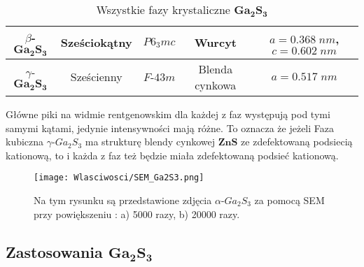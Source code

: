 \begin{table}[H]
\begin{tabular}{|c|c|c|c|c|}
		$\beta$-$\mathbf{Ga_{2}S_{3}}$                              & Sześciokątny                                                                & $P6_{3}mc$                     & Wurcyt                                                            & $a=0.368\;nm$,                                                                                           $c=0.602\;nm$                                                                              \\ \hline
		$\gamma$-$\mathbf{Ga_{2}S_{3}}$                              & Sześcienny                                                                  & $F$-$43m$                       & Blenda cynkowa                                                    & $a=0.517\;nm$                                                                            \\ \hline
	\end{tabular}
	\caption{Wszystkie fazy krystaliczne $\mathbf{Ga_{2}S_{3}}$}
\end{table}

Główne piki na widmie rentgenowskim dla każdej z faz występują pod tymi samymi kątami, jedynie intensywności mają różne. To oznacza że jeżeli Faza kubiczna $\gamma$-$Ga_{2}S_{3}$ ma strukturę blendy cynkowej $\mathbf{ZnS}$ ze zdefektowaną podsiecią kationową, to i każda z faz też będzie miała zdefektowaną podsieć kationową.

\begin{figure}[H]
	\begin{center}
		\texttt{[image: Wlasciwosci/SEM\_Ga2S3.png]}
		\caption{Na tym rysunku są przedstawione zdjęcia $\alpha$-$Ga_{2}S_{3}$ za pomocą SEM przy powiększeniu : a) 5000 razy, b) 20000 razy.}
	\end{center}
\end{figure}

\subsection{Zastosowania $\mathbf{Ga_{2}S_{3}}$}

